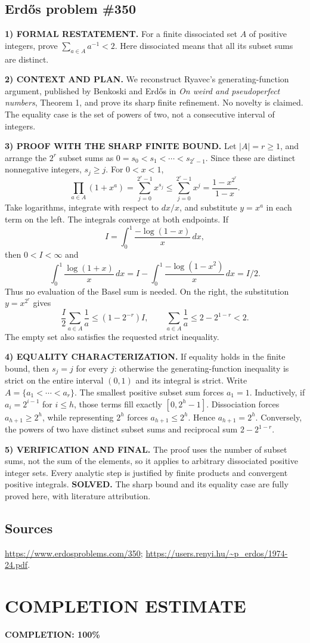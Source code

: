 \subsection*{Erd\H{o}s problem \#350}

\noindent\textbf{1) FORMAL RESTATEMENT.}
For a finite dissociated set $A$ of positive integers, prove $\sum_{a\in A}a^{-1}<2$. Here dissociated means that all its subset sums are distinct.

\noindent\textbf{2) CONTEXT AND PLAN.}
We reconstruct Ryavec's generating-function argument, published by Benkoski and Erd\H{o}s in \emph{On weird and pseudoperfect numbers}, Theorem 1, and prove its sharp finite refinement. No novelty is claimed. The equality case is the set of powers of two, not a consecutive interval of integers.

\noindent\textbf{3) PROOF WITH THE SHARP FINITE BOUND.}
Let $|A|=r\ge1$, and arrange the $2^r$ subset sums as
$0=s_0<s_1<\cdots<s_{2^r-1}$. Since these are distinct nonnegative integers, $s_j\ge j$. For $0<x<1$,
\[
 \prod_{a\in A}(1+x^a)=\sum_{j=0}^{2^r-1}x^{s_j}
 \le\sum_{j=0}^{2^r-1}x^j=\frac{1-x^{2^r}}{1-x}.
\]
Take logarithms, integrate with respect to $dx/x$, and substitute $y=x^a$ in each term on the left. The integrals converge at both endpoints. If
\[
 I=\int_0^1\frac{-\log(1-x)}x\,dx,
\]
then $0<I<\infty$ and
\[
 \int_0^1\frac{\log(1+x)}x\,dx
 =I-\int_0^1\frac{-\log(1-x^2)}x\,dx=I/2.
\]
Thus no evaluation of the Basel sum is needed. On the right, the substitution $y=x^{2^r}$ gives
\[
 \frac I2\sum_{a\in A}\frac1a\le(1-2^{-r})I,
 \qquad
 \sum_{a\in A}\frac1a\le2-2^{1-r}<2.
\]
The empty set also satisfies the requested strict inequality.

\noindent\textbf{4) EQUALITY CHARACTERIZATION.}
If equality holds in the finite bound, then $s_j=j$ for every $j$: otherwise the generating-function inequality is strict on the entire interval $(0,1)$ and its integral is strict. Write $A=\{a_1<\cdots<a_r\}$. The smallest positive subset sum forces $a_1=1$. Inductively, if $a_i=2^{i-1}$ for $i\le h$, those terms fill exactly $[0,2^h-1]$. Dissociation forces $a_{h+1}\ge2^h$, while representing $2^h$ forces $a_{h+1}\le2^h$. Hence $a_{h+1}=2^h$. Conversely, the powers of two have distinct subset sums and reciprocal sum $2-2^{1-r}$.

\noindent\textbf{5) VERIFICATION AND FINAL.}
The proof uses the number of subset sums, not the sum of the elements, so it applies to arbitrary dissociated positive integer sets. Every analytic step is justified by finite products and convergent positive integrals. \textbf{SOLVED.} The sharp bound and its equality case are fully proved here, with literature attribution.

\subsection*{Sources}
\url{https://www.erdosproblems.com/350}; \url{https://users.renyi.hu/~p_erdos/1974-24.pdf}.

\section{COMPLETION ESTIMATE}
\textbf{COMPLETION: 100\%}
